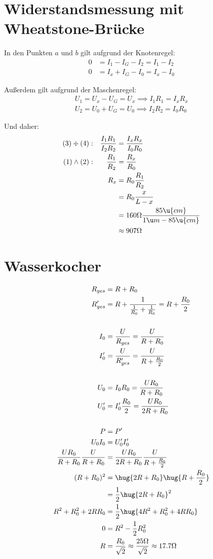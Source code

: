 \documentclass[11pt, german]{article}
\begin{document}
\section{Widerstandsmessung mit Wheatstone-Brücke}

In den Punkten $a$ und $b$ gilt aufgrund der Knotenregel:
\begin{align}
    0 &= I_1 - I_G - I_2 = I_1 - I_2\\ 
    0 &= I_x + I_G - I_0 = I_x - I_0
\end{align}

Außerdem gilt aufgrund der Maschenregel:
\begin{align}
    U_1 = U_x - U_G = U_x \implies I_1 R_1 = I_x R_x\\
    U_2 = U_0 + U_G = U_0 \implies I_2 R_2 = I_0 R_0
\end{align}

Und daher:
\begin{align*}
    (3)\div (4) &:& \frac{I_1 R_1}{I_2 R_2} &= \frac{I_x R_x}{I_0 R_0}\\
    (1)\land (2) &:& \frac{R_1}{R_2} &= \frac{R_x}{R_0}\\
    &&  R_x &= R_0 \frac{R_1}{R_2}\\
    &&&= R_0 \frac{x}{L-x}\\
    &&&= 160\Omega \frac{85 \u{cm}}{1\u m - 85\u{cm}} \\
    &&&\approx 907 \Omega
\end{align*}

\section{Wasserkocher}
\begin{align*}
    R_{ges} &= R + R_0\\
    R_{ges}' &= R + \frac{1}{\frac{1}{R_0} + \frac{1}{R_0}}
    = R +  \frac{R_0}{2}\\
    \\
    I_0 &= \frac{U}{R_{ges}} = \frac{U}{R + R_0}\\
    I_0' &= \frac{U}{R_{ges}'} = \frac{U}{R +  \frac{R_0}{2}}\\ 
    \\
    U_0 &= I_0 R_0 = \frac{U R_0}{R + R_0}\\
    U_0' &= I_0' \frac{R_0}2 = \frac{U R_0}{2R + R_0}\\
    \\
    P &= P'\\
    U_0 I_0 &= U_0' I_0'\\
    \frac{U R_0}{R + R_0}\frac{U}{R + R_0} &= 
    \frac{U R_0}{2R + R_0} \frac{U}{R +  \frac{R_0}{2}}\\
    (R + R_0)^2 &= \hug{2R + R_0}\hug{R +  \frac{R_0}{2}}\\
    &= \frac{1}{2} \hug{2R + R_0}^2\\
    R^2 + R_0^2 + 2R R_0&= \frac{1}{2} \hug{4R^2 + R_0^2 + 4R R_0}\\
    0 &= R^2 - \frac12 R_0^2\\
    R &= \frac {R_0} {\sqrt{2}}\approx \frac{25 \Omega}{\sqrt{2}}\approx 17.7 \Omega
\end{align*}
\end{document}
